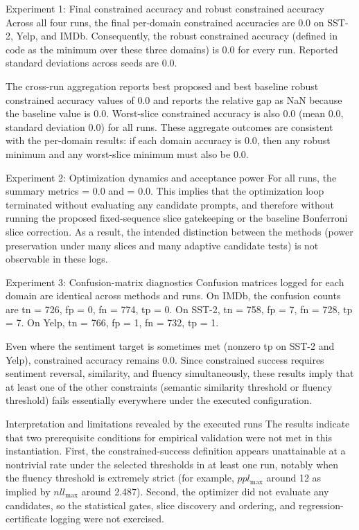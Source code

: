 \documentclass{article} %
\begin{document}
Experiment 1: Final constrained accuracy and robust constrained accuracy
Across all four runs, the final per-domain constrained accuracies are 0.0 on SST-2, Yelp, and IMDb. Consequently, the robust constrained accuracy (defined in code as the minimum over these three domains) is 0.0 for every run. Reported standard deviations across seeds are 0.0.

The cross-run aggregation reports best proposed and best baseline robust constrained accuracy values of 0.0 and reports the relative gap as NaN because the baseline value is 0.0. Worst-slice constrained accuracy is also 0.0 (mean 0.0, standard deviation 0.0) for all runs. These aggregate outcomes are consistent with the per-domain results: if each domain accuracy is 0.0, then any robust minimum and any worst-slice minimum must also be 0.0.

Experiment 2: Optimization dynamics and acceptance power
For all runs, the summary metrics  = 0.0 and  = 0.0. This implies that the optimization loop terminated without evaluating any candidate prompts, and therefore without running the proposed fixed-sequence slice gatekeeping or the baseline Bonferroni slice correction. As a result, the intended distinction between the methods (power preservation under many slices and many adaptive candidate tests) is not observable in these logs.

Experiment 3: Confusion-matrix diagnostics
Confusion matrices logged for each domain are identical across methods and runs. On IMDb, the confusion counts are tn = 726, fp = 0, fn = 774, tp = 0. On SST-2, tn = 758, fp = 7, fn = 728, tp = 7. On Yelp, tn = 766, fp = 1, fn = 732, tp = 1.

Even where the sentiment target is sometimes met (nonzero tp on SST-2 and Yelp), constrained accuracy remains 0.0. Since constrained success requires sentiment reversal, similarity, and fluency simultaneously, these results imply that at least one of the other constraints (semantic similarity threshold or fluency threshold) fails essentially everywhere under the executed configuration.

Interpretation and limitations revealed by the executed runs
The results indicate that two prerequisite conditions for empirical validation were not met in this instantiation. First, the constrained-success definition appears unattainable at a nontrivial rate under the selected thresholds in at least one run, notably when the fluency threshold is extremely strict (for example, $ppl_{\max}$ around 12 as implied by $nll_{\max}$ around 2.487). Second, the optimizer did not evaluate any candidates, so the statistical gates, slice discovery and ordering, and regression-certificate logging were not exercised.
\end{document}
